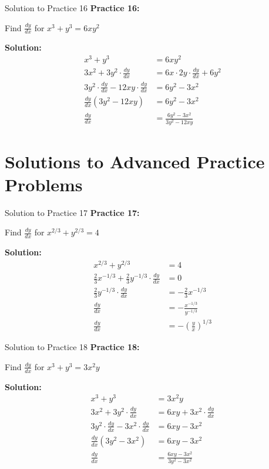\documentclass[aspectratio=169]{beamer}
\begin{document}
\begin{frame}{Solution to Practice 16}
\textbf{Practice 16:}

Find $\frac{dy}{dx}$ for $x^3 + y^3 = 6xy^2$

\textbf{Solution:}
\[
\begin{aligned}
  x^3 + y^3 &= 6xy^2 \\
  3x^2 + 3y^2 \cdot \frac{dy}{dx} &= 6x \cdot 2y \cdot \frac{dy}{dx} + 6y^2 \\
  3y^2 \cdot \frac{dy}{dx} - 12xy \cdot \frac{dy}{dx} &= 6y^2 - 3x^2 \\
  \frac{dy}{dx}(3y^2 - 12xy) &= 6y^2 - 3x^2 \\
  \frac{dy}{dx} &= \frac{6y^2 - 3x^2}{3y^2 - 12xy}
\end{aligned}
\]
\end{frame}

\section{Solutions to Advanced Practice Problems}

\begin{frame}{Solution to Practice 17}
\textbf{Practice 17:}

Find $\frac{dy}{dx}$ for $x^{2/3} + y^{2/3} = 4$

\textbf{Solution:}
\[
\begin{aligned}
  x^{2/3} + y^{2/3} &= 4 \\
  \frac{2}{3}x^{-1/3} + \frac{2}{3}y^{-1/3} \cdot \frac{dy}{dx} &= 0 \\
  \frac{2}{3}y^{-1/3} \cdot \frac{dy}{dx} &= -\frac{2}{3}x^{-1/3} \\
  \frac{dy}{dx} &= -\frac{x^{-1/3}}{y^{-1/3}} \\
  \frac{dy}{dx} &= -\left(\frac{y}{x}\right)^{1/3}
\end{aligned}
\]
\end{frame}

\begin{frame}{Solution to Practice 18}
\textbf{Practice 18:}

Find $\frac{dy}{dx}$ for $x^3 + y^3 = 3x^2y$

\textbf{Solution:}
\[
\begin{aligned}
  x^3 + y^3 &= 3x^2y \\
  3x^2 + 3y^2 \cdot \frac{dy}{dx} &= 6xy + 3x^2 \cdot \frac{dy}{dx} \\
  3y^2 \cdot \frac{dy}{dx} - 3x^2 \cdot \frac{dy}{dx} &= 6xy - 3x^2 \\
  \frac{dy}{dx}(3y^2 - 3x^2) &= 6xy - 3x^2 \\
  \frac{dy}{dx} &= \frac{6xy - 3x^2}{3y^2 - 3x^2}
\end{aligned}
\]
\end{frame}
\end{document}
